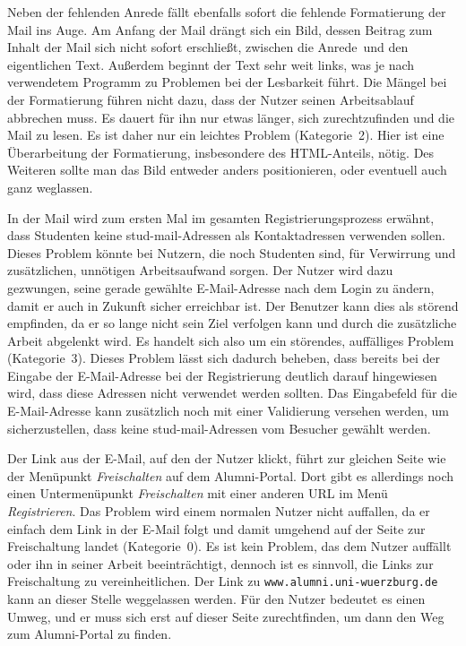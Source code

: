 {
Neben der fehlenden Anrede fällt ebenfalls sofort die fehlende Formatierung der Mail ins Auge. Am Anfang der Mail drängt sich ein Bild, dessen Beitrag zum Inhalt der Mail sich nicht sofort erschließt, zwischen die \glqq Anrede\grqq ~und den eigentlichen Text. Außerdem beginnt der Text sehr weit links, was je nach verwendetem Programm zu Problemen bei der Lesbarkeit führt.
}
{
Die Mängel bei der Formatierung führen nicht dazu, dass der Nutzer seinen Arbeitsablauf abbrechen muss. Es dauert für ihn nur etwas länger, sich zurechtzufinden und die Mail zu lesen. Es ist daher nur ein leichtes Problem (Kategorie~2).
}
{
Hier ist eine Überarbeitung der Formatierung, insbesondere des HTML-Anteils, nötig. Des Weiteren sollte man das Bild entweder anders positionieren, oder eventuell auch ganz weglassen.
}
\label{prob:frei:mailformat}

{
In der Mail wird zum ersten Mal im gesamten Registrierungsprozess erwähnt, dass Studenten keine stud\hbox{-}mail-Adressen als Kontaktadressen verwenden sollen.
}
{
Dieses Problem könnte bei Nutzern, die noch Studenten sind, für Verwirrung und zusätzlichen, unnötigen Arbeitsaufwand sorgen. Der Nutzer wird dazu gezwungen, seine gerade gewählte E\hbox{-}Mail-Adresse nach dem Login zu ändern, damit er auch in Zukunft sicher erreichbar ist. Der Benutzer kann dies als störend empfinden, da er so lange nicht sein Ziel verfolgen kann und durch die zusätzliche Arbeit abgelenkt wird. Es handelt sich also um ein störendes, auffälliges Problem (Kategorie~3).
}
{
Dieses Problem lässt sich dadurch beheben, dass bereits bei der Eingabe der E\hbox{-}Mail-Adresse bei der Registrierung deutlich darauf hingewiesen wird, dass diese Adressen nicht verwendet werden sollten. Das Eingabefeld für die E\hbox{-}Mail-Adresse kann zusätzlich noch mit einer Validierung versehen werden, um sicherzustellen, dass keine stud\hbox{-}mail-Adressen vom Besucher gewählt werden.
}
\label{prob:frei:studmail}

{
Der Link aus der E\hbox{-}Mail, auf den der Nutzer klickt, führt zur gleichen Seite wie der Menüpunkt \emph{Freischalten} auf dem Alumni-Portal. Dort gibt es allerdings noch einen Untermenüpunkt \emph{Freischalten} mit einer anderen URL im Menü  \emph{ Registrieren}.
}
{
Das Problem wird einem normalen Nutzer nicht auffallen, da er einfach dem Link in der E\hbox{-}Mail folgt und damit umgehend auf der Seite zur Freischaltung landet (Kategorie~0).
}
{
Es ist kein Problem, das dem Nutzer auffällt oder ihn in seiner Arbeit beeinträchtigt, dennoch ist es sinnvoll, die Links zur Freischaltung zu vereinheitlichen. Der Link zu \texttt{www.alumni.uni-wuerzburg.de} kann an dieser Stelle weggelassen werden. Für den Nutzer bedeutet es einen Umweg, und er muss sich erst auf dieser Seite zurechtfinden, um dann den Weg zum Alumni-Portal zu finden.
}
\label{prob:frei:link}

